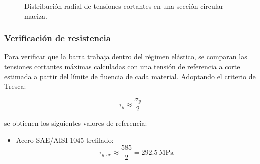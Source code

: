 \documentclass[12pt,a4paper]{article}
\begin{document}
\begin{enumerate}
\begin{figure}[H]
\caption{Distribución radial de tensiones cortantes en una sección circular maciza.}
\label{fig:distribucion_tensiones_ej2}
\end{figure}

\subsubsection*{Verificación de resistencia}

Para verificar que la barra trabaja dentro del régimen elástico, se comparan las tensiones cortantes máximas calculadas con una tensión de referencia a corte estimada a partir del límite de fluencia de cada material. Adoptando el criterio de Tresca:

\begin{equation}
\tau_y \approx \frac{\sigma_y}{2}
\end{equation}

se obtienen los siguientes valores de referencia:

\begin{itemize}
    \item Acero SAE/AISI 1045 trefilado:
    \[
    \tau_{y,ac} \approx \frac{585}{2} = 292.5\ \text{MPa}
    \]


\end{itemize}
\end{enumerate}
\end{document}
